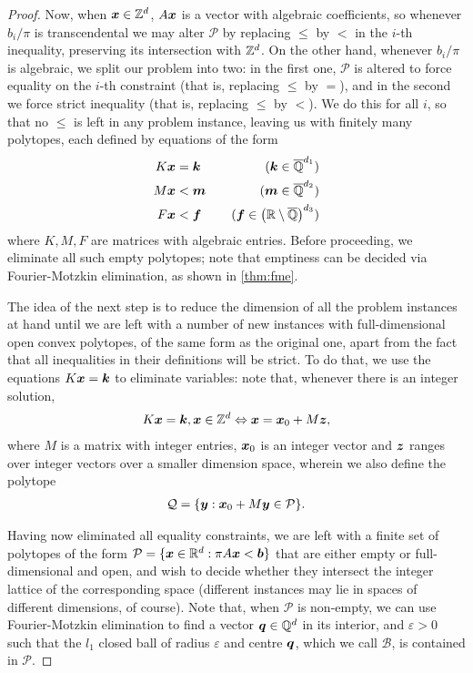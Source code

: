\begin{proof}
Now, when $\boldsymbol{x} \in \mathbb{Z}^{d}$, $A \boldsymbol{x}$ is a vector with algebraic coefficients, so whenever $b_{i} / \pi$ is transcendental we may alter $\mathcal{P}$ by replacing $\leq$ by $<$ in the $i$-th inequality, preserving its intersection with $\mathbb{Z}^{d}$. On the other hand, whenever $b_{i} / \pi$ is algebraic, we split our problem into two: in the first one, $\mathcal{P}$ is altered to force equality on the $i$-th constraint (that is, replacing $\leq$ by $=$), and in the second we force strict inequality (that is, replacing $\leq$ by $<$). We do this for all $i$, so that no $\leq$ is left in any problem instance, leaving us with finitely many polytopes, each defined by equations of the form
\begin{align*}
K \boldsymbol{x} &= \boldsymbol{k} \quad &(\boldsymbol{k} \in \overline{\mathbb{Q}}^{d_{1}}) \\
M \boldsymbol{x} &< \boldsymbol{m} \quad &(\boldsymbol{m} \in \overline{\mathbb{Q}}^{d_{2}}) \\
F \boldsymbol{x} &< \boldsymbol{f} \quad &(\boldsymbol{f} \in \left(\mathbb{R} \setminus \overline{\mathbb{Q}} \right)^{d_{3}})
\end{align*}
where $K,M,F$ are matrices with algebraic entries. Before proceeding, we eliminate all such empty polytopes; note that emptiness can be decided via Fourier-Motzkin elimination, as shown in \cref{thm:fme}.

The idea of the next step is to reduce the dimension of all the problem instances at hand until we are left with a number of new instances with full-dimensional open convex polytopes, of the same form as the original one, apart from the fact that all inequalities in their definitions will be strict. To do that, we use the equations $K \boldsymbol{x} = \boldsymbol{k}$ to eliminate variables: note that, whenever there is an integer solution,
\begin{align*}
K \boldsymbol{x} = \boldsymbol{k}, \boldsymbol{x} \in \mathbb{Z}^{d} \Leftrightarrow \boldsymbol{x} = \boldsymbol{x}_{0} + M \boldsymbol{z},
\end{align*}
where $M$ is a matrix with integer entries, $\boldsymbol{x}_{0}$ is an integer vector and $\boldsymbol{z}$ ranges over integer vectors over a smaller dimension space, wherein we also define the polytope
\begin{align*}
\mathcal{Q} = \lbrace \boldsymbol{y} : \boldsymbol{x}_{0} + M \boldsymbol{y} \in \mathcal{P} \rbrace .
\end{align*}

Having now eliminated all equality constraints, we are left with a finite set of polytopes of the form $\mathcal{P} = \lbrace \boldsymbol{x} \in \mathbb{R}^{d}: \pi A \boldsymbol{x} < \boldsymbol{b} \rbrace$ that are either empty or full-dimensional and open, and wish to decide whether they intersect the integer lattice of the corresponding space (different instances may lie in spaces of different dimensions, of course). Note that, when $\mathcal{P}$ is non-empty, we can use Fourier-Motzkin elimination to find a vector $\boldsymbol{q} \in \mathbb{Q}^{d}$ in its interior, and $\varepsilon > 0$ such that the $l_{1}$ closed ball of radius $\varepsilon$ and centre $\boldsymbol{q}$, which we call $\mathcal{B}$, is contained in $\mathcal{P}$.


\end{proof}
